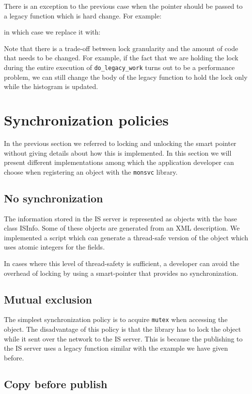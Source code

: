 There is an exception to the previous case when the pointer should be passed to a legacy function which is hard change. For example:

in which case we replace it with:


Note that there is a trade-off between lock granularity and the amount of code that needs to be changed. For example, if the fact that we are holding the lock during the entire execution of \verb+do_legacy_work+ turns out to be a performance problem, we can still change the body of the legacy function to hold the lock only while the histogram is updated.

\section{Synchronization policies}

In the previous section we referred to locking and unlocking the smart pointer without giving details about how this is implemented. In this section we will present different implementations among which the application developer can choose when registering an object with the {\tt monsvc} library.

\subsection{No synchronization}

The information stored in the IS server is represented as objects with the base class ISInfo. Some of these objects are generated from an XML description. We implemented a script which can generate a thread-safe version of the object which uses atomic integers for the fields. 

In cases where this level of thread-safety is sufficient, a developer can avoid the overhead of locking by using a smart-pointer that provides no synchronization.

\subsection{Mutual exclusion}

The simplest synchronization policy is to acquire \verb+mutex+ when accessing the object. The disadvantage of this policy is that the library has to lock the object while it sent over the network to the IS server. This is because the publishing to the IS server uses a legacy function similar with the example we have given before.

\subsection{Copy before publish}

